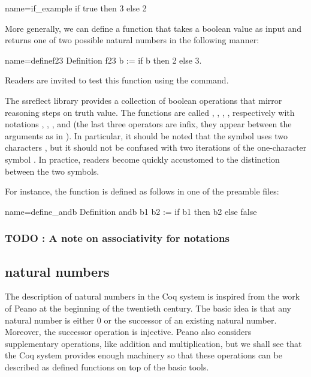 \begin{coq}{name=if_example}{}
 if true then 3 else 2
\end{coq}
More generally, we can define a function that takes a boolean value as
input and returns one of two possible natural numbers in the following
manner:

\begin{coq}{name=definef23}{}
Definition f23 b := if b then 2 else 3.
\end{coq}
Readers are invited to test this function using the  command.

The ssreflect library provides a collection of boolean operations that
mirror reasoning steps on truth value.  The functions are called
, ,  , , respectively with notations
\C{\~\~},  \C{||}, \C{&&}, and \C{==>} (the last three operators are
infix, they appear between the arguments as in ).
  In
particular, it should be
noted that the symbol \C{\~\~} uses two characters \C{\~}, but it should
not be confused with two iterations of the one-character symbol
\C{\~}.  In practice, readers become quickly accustomed to the
distinction between the two symbols.

For instance, the function  is defined as follows in one of
the preamble files:

\begin{coq}{name=define_andb}{}
Definition andb b1 b2 := if b1 then b2 else false
\end{coq}

\subsubsection{TODO : A note on associativity for notations}

\subsection{natural numbers}
The description of natural numbers in the Coq system is inspired from
the work of Peano at the beginning of the twentieth century.  The
basic idea is that any natural number is either 0 or the successor of
an existing natural number.  Moreover, the successor operation is
injective.  Peano also considers supplementary operations, like
addition and multiplication, but we shall see that the Coq system
provides enough machinery so that these operations can be described as
defined functions on top of the basic tools.

